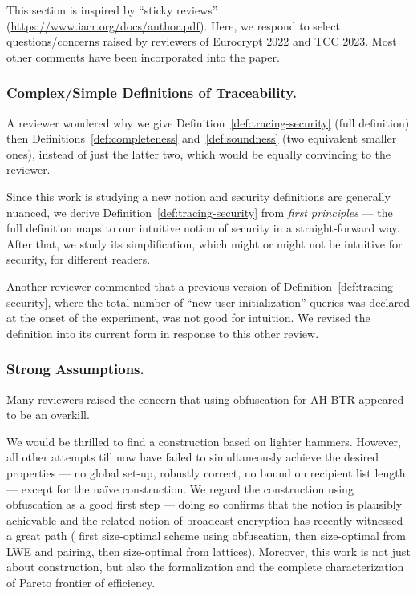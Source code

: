 This section is inspired by ``sticky reviews''
(\url{https://www.iacr.org/docs/author.pdf}).
Here, we respond to select questions/concerns raised by reviewers
of Euro\-crypt 2022 and TCC 2023.
Most other comments have been incorporated into the paper.

\subsubsection{Complex/Simple Definitions of Traceability.}
A reviewer wondered why we give
Definition~\ref{def:tracing-security} (full definition)
then Definitions~\ref{def:completeness} and~\ref{def:soundness}
(two equivalent smaller ones),
instead of just the latter two,
which would be equally convincing to the reviewer.

Since this work is studying a new notion and
security definitions are generally nuanced,
we derive Definition~\ref{def:tracing-security}
from \emph{first principles} ---
the full definition maps to our intuitive notion of security
in a straight-forward way.
After that, we study its simplification,
which might or might not be intuitive for security,
for different readers.

Another reviewer commented that
a previous version of Definition~\ref{def:tracing-security},
where the total number of ``new user initialization'' queries
was declared at the onset of the experiment,
was not good for intuition.
We revised the definition into its current form
in response to this other review.

\subsubsection{Strong Assumptions.}
Many reviewers raised the concern
that using obfuscation for AH-BTR appeared to be an overkill.

We would be thrilled to find a construction based on lighter hammers.
However, all other attempts till now have failed
to simultaneously achieve the desired properties ---
no global set-up,
robustly correct,
no bound on recipient list length ---
except for the na\"ive construction.
We regard the construction using obfuscation as a good first step ---
doing so confirms that the notion is plausibly achievable and
the related notion of broadcast encryption has recently witnessed a great path
(\cite{C:BonWatZha14} first size-optimal scheme using obfuscation, then
\cite{EC:AgrYam20,TCC:AgrWicYam20} size-optimal from LWE and pairing, then
\cite{EC:Wee22} size-optimal from lattices).
Moreover, this work is not just about construction,
but also the formalization and
the complete characterization of Pareto frontier of efficiency.
